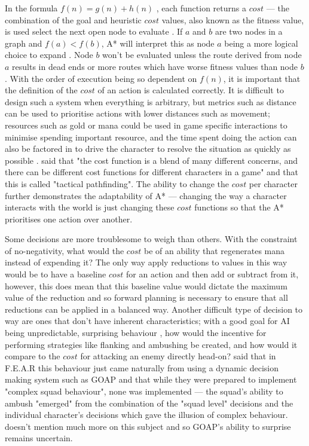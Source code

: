 \documentclass[11pt, a4paper]{report}
\begin{document}
In the formula $f(n) = g(n) + h(n)$ \parencite{hart1968formal}, each function returns a $cost$ --- the combination of the goal and heuristic $cost$ values, also known as the fitness value, is used select the next open node to evaluate \parencite[94]{russell2016artificial}. If $a$ and $b$ are two nodes in a graph and $f(a) < f(b)$, A* will interpret this as node $a$ being a more logical choice to expand \parencite[7]{orkin2003applying}. Node $b$ won't be evaluated unless the route derived from node $a$ results in dead ends or more routes which have worse fitness values than node $b$. With the order of execution being so dependent on $f(n)$, it is important that the definition of the $cost$ of an action is calculated correctly. It is difficult to design such a system when everything is arbitrary, but metrics such as distance can be used to prioritise actions with lower distances such as movement; resources such as gold or mana could be used in game specific interactions to minimise spending important resource, and the time spent doing the action can also be factored in to drive the character to resolve the situation as quickly as possible \parencite[8]{lester2005pathfinding}. \citeauthor{millington2019ai} \parencite*{millington2019ai} said that "the cost function is a blend of many different concerns, and there can be different cost functions for different characters in a game" and that this is called "tactical pathfinding". The ability to change the $cost$ per character further demonstrates the adaptability of A* --- changing the way a character interacts with the world is just changing these $cost$ functions so that the A* prioritises one action over another.

Some decisions are more troublesome to weigh than others. With the constraint of no-negativity, what would the $cost$ be of an ability that regenerates mana instead of expending it? The only way apply reductions to values in this way would be to have a baseline $cost$ for an action and then add or subtract from it, however, this does mean that this baseline value would dictate the maximum value of the reduction and so forward planning is necessary to ensure that all reductions can be applied in a balanced way. Another difficult type of decision to way are ones that don't have inherent characteristics; with a good goal for AI being unpredictable, surprising behaviour \parencite[17]{scott2002illusion}, how would the incentive for performing strategies like flanking and ambushing be created, and how would it compare to the $cost$ for attacking an enemy directly head-on? \citeauthor{orkin2006three} \parencite*[14]{orkin2006three} said that in F.E.A.R \parencite{FEAR} this behaviour just came naturally from using a dynamic decision making system such as GOAP and that while they were prepared to implement "complex squad behaviour", none was implemented --- the squad's ability to ambush "emerged" from the combination of the "squad level" decisions and the individual character's decisions which gave the illusion of complex behaviour. \citeauthor{orkin2006three} doesn't mention much more on this subject and so GOAP's ability to surprise remains uncertain.
\end{document}
